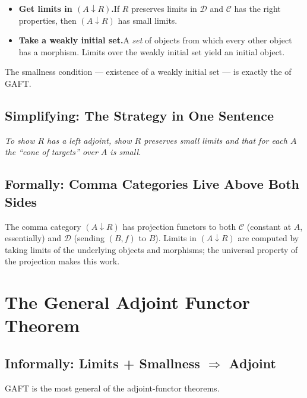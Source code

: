 \begin{itemize}
  \item \textbf{Get limits in $(A \downarrow R)$.}\quad If $R$ preserves
        limits in $\mathcal{D}$ and $\mathcal{C}$ has the right
        properties, then $(A \downarrow R)$ has small limits.
  \item \textbf{Take a weakly initial set.}\quad A \emph{set} of objects
        from which every other object has a morphism. Limits over the
        weakly initial set yield an initial object.
\end{itemize}

The smallness condition --- existence of a weakly initial set --- is
exactly the  of GAFT.

\subsection{Simplifying: The Strategy in One Sentence}

\textit{To show $R$ has a left adjoint, show $R$ preserves small limits
and that for each $A$ the ``cone of targets'' over $A$ is small.}

\subsection{Formally: Comma Categories Live Above Both Sides}

The comma category $(A \downarrow R)$ has projection functors to both
$\mathcal{C}$ (constant at $A$, essentially) and $\mathcal{D}$ (sending
$(B, f)$ to $B$). Limits in $(A \downarrow R)$ are computed by taking
limits of the underlying objects and morphisms; the universal property of
the projection makes this work.


\section{The General Adjoint Functor Theorem}
\label{sec:gaft}

\subsection{Informally: Limits + Smallness $\Rightarrow$ Adjoint}

GAFT is the most general of the adjoint-functor theorems.

